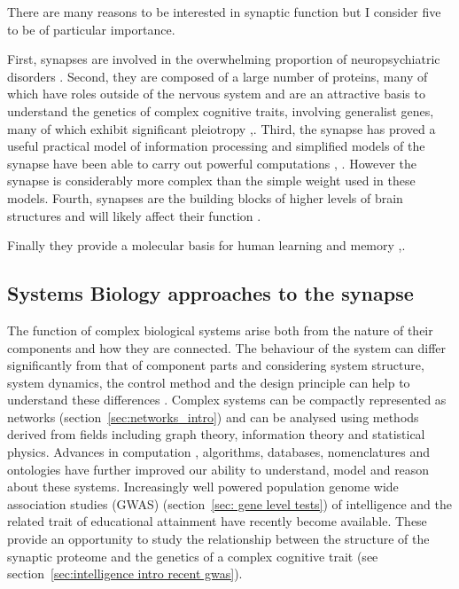 There are many reasons to be interested in synaptic function but I consider five to be of particular importance. 

First, synapses are involved in the overwhelming proportion of neuropsychiatric disorders \cite{grant2012synaptopathies}.  Second, they are composed of a large number of proteins, many of which have roles outside of the nervous system and are an attractive basis to understand the genetics of complex cognitive traits, involving generalist genes, many of which exhibit significant pleiotropy \cite{sharma2000induction},\cite{plomin2015genetics}. Third, the synapse has proved a useful practical model of information processing and simplified models of the synapse have been able to carry out powerful computations \cite{hinton2007learning}, \cite{dean2012three}. However the synapse is considerably more complex than the simple weight used in these models. Fourth, synapses are the building blocks of higher levels of brain structures \cite{armstrong2012evolution} and will likely affect their function \cite{dean2012three}.

Finally they provide a molecular basis for human learning and memory \cite{kandel2014molecular},\cite{gallistel2013neuroscience}.



      




 

\subsection{Systems Biology approaches to the synapse}
 The function of complex biological systems arise both from the nature of their components and how they are connected\cite{kitano2002systems}. The behaviour of the system can differ significantly from that of component parts and considering system structure, system dynamics, the control method and the design principle can help to understand these differences \cite{kitano2002systems}. Complex systems can be compactly represented as networks (section~\ref{sec:networks_intro}) and can be analysed using methods derived from fields including graph theory, information theory and statistical physics\cite{newman2018networks}. Advances in computation \cite{nobile2017graphics}, algorithms, databases, nomenclatures \cite{ito2014systematic} and ontologies \cite{smith2007obo} have further improved our ability to understand, model and reason about these systems. Increasingly well powered population genome wide association studies (GWAS) (section~\ref{sec: gene level tests}) of intelligence and the related trait of educational attainment have recently become available. These provide an opportunity to study the relationship between the structure of the synaptic proteome and the genetics of a complex cognitive trait (see section~\ref{sec:intelligence intro recent gwas}).
 
